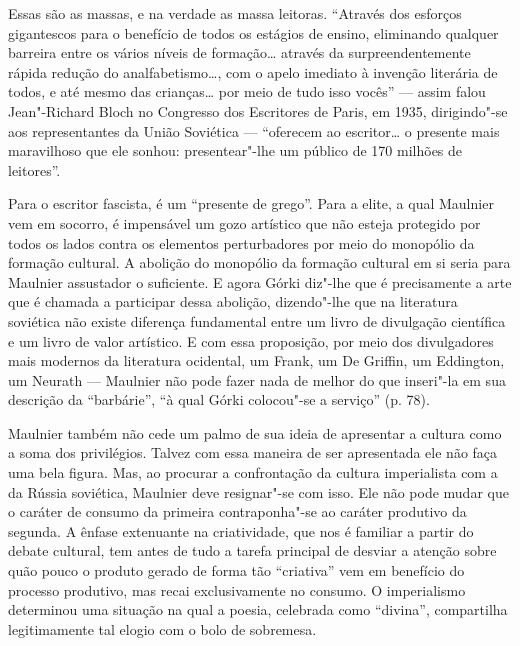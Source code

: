 Essas são as massas, e na verdade as massa leitoras. ``Através dos esforços
gigantescos para o benefício de todos os estágios de ensino, eliminando
qualquer barreira entre os vários níveis de formação\ldots{} através da
surpreendentemente rápida redução do analfabetismo\ldots{}, com o apelo
imediato à invenção literária de todos, e até mesmo das crianças\ldots{} por
meio de tudo isso vocês'' --- assim falou Jean"-Richard Bloch no Congresso
dos Escritores de Paris, em 1935, dirigindo"-se aos representantes da
União Soviética --- ``oferecem ao escritor\ldots{} o presente mais
maravilhoso que ele sonhou: presentear"-lhe um público de 170 milhões de
leitores''.

Para o escritor fascista, é um ``presente de grego''. Para a elite, a qual Maulnier vem em socorro, é impensável um gozo artístico que não esteja protegido por todos os lados contra os elementos perturbadores por meio do monopólio da formação cultural. A abolição do monopólio da formação cultural em si seria para
Maulnier assustador o suficiente. E agora Górki diz"-lhe que é
precisamente a arte que é chamada a participar dessa abolição,
dizendo"-lhe que na literatura soviética não existe diferença fundamental
entre um livro de divulgação científica e um livro de valor artístico. E
com essa proposição, por meio dos divulgadores mais modernos da literatura
ocidental, um Frank, um De Griffin, um Eddington, um Neurath --- Maulnier %
não pode fazer nada de melhor do que inseri"-la em sua descrição da
``barbárie'', ``à qual Górki colocou"-se a serviço'' (p. 78).

Maulnier também não cede um palmo de sua ideia de apresentar a cultura
como a soma dos privilégios. Talvez com essa maneira de ser apresentada ele não faça
uma bela figura. Mas, ao procurar a confrontação da cultura imperialista com a da
Rússia soviética, Maulnier deve resignar"-se com isso. Ele não pode mudar
que o caráter de consumo da primeira contraponha"-se ao caráter produtivo da segunda. A ênfase extenuante na criatividade, que nos é
familiar a partir do debate cultural, tem antes de tudo a tarefa
principal de desviar a atenção sobre quão pouco o produto gerado de
forma tão ``criativa'' vem em benefício do processo produtivo, mas
recai exclusivamente no consumo. O imperialismo determinou uma situação
na qual a poesia, celebrada como ``divina'', compartilha legitimamente tal elogio com o bolo de sobremesa.

